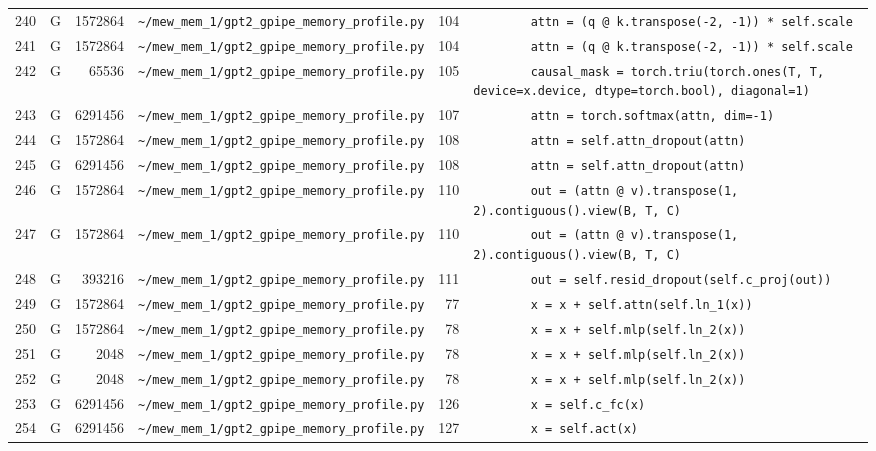 \documentclass{article}
\begin{document}
\begin{longtable}{r l r p{6.5cm} r p{7.0cm}}
240 & G & 1572864 & \lstinline|~/mew_mem_1/gpt2_gpipe_memory_profile.py| & 104 & \lstinline|        attn = (q @ k.transpose(-2, -1)) * self.scale| \\
241 & G & 1572864 & \lstinline|~/mew_mem_1/gpt2_gpipe_memory_profile.py| & 104 & \lstinline|        attn = (q @ k.transpose(-2, -1)) * self.scale| \\
242 & G & 65536 & \lstinline|~/mew_mem_1/gpt2_gpipe_memory_profile.py| & 105 & \lstinline|        causal_mask = torch.triu(torch.ones(T, T, device=x.device, dtype=torch.bool), diagonal=1)| \\
243 & G & 6291456 & \lstinline|~/mew_mem_1/gpt2_gpipe_memory_profile.py| & 107 & \lstinline|        attn = torch.softmax(attn, dim=-1)| \\
244 & G & 1572864 & \lstinline|~/mew_mem_1/gpt2_gpipe_memory_profile.py| & 108 & \lstinline|        attn = self.attn_dropout(attn)| \\
245 & G & 6291456 & \lstinline|~/mew_mem_1/gpt2_gpipe_memory_profile.py| & 108 & \lstinline|        attn = self.attn_dropout(attn)| \\
246 & G & 1572864 & \lstinline|~/mew_mem_1/gpt2_gpipe_memory_profile.py| & 110 & \lstinline|        out = (attn @ v).transpose(1, 2).contiguous().view(B, T, C)| \\
247 & G & 1572864 & \lstinline|~/mew_mem_1/gpt2_gpipe_memory_profile.py| & 110 & \lstinline|        out = (attn @ v).transpose(1, 2).contiguous().view(B, T, C)| \\
248 & G & 393216 & \lstinline|~/mew_mem_1/gpt2_gpipe_memory_profile.py| & 111 & \lstinline|        out = self.resid_dropout(self.c_proj(out))| \\
249 & G & 1572864 & \lstinline|~/mew_mem_1/gpt2_gpipe_memory_profile.py| & 77 & \lstinline|        x = x + self.attn(self.ln_1(x))| \\
250 & G & 1572864 & \lstinline|~/mew_mem_1/gpt2_gpipe_memory_profile.py| & 78 & \lstinline|        x = x + self.mlp(self.ln_2(x))| \\
251 & G & 2048 & \lstinline|~/mew_mem_1/gpt2_gpipe_memory_profile.py| & 78 & \lstinline|        x = x + self.mlp(self.ln_2(x))| \\
252 & G & 2048 & \lstinline|~/mew_mem_1/gpt2_gpipe_memory_profile.py| & 78 & \lstinline|        x = x + self.mlp(self.ln_2(x))| \\
253 & G & 6291456 & \lstinline|~/mew_mem_1/gpt2_gpipe_memory_profile.py| & 126 & \lstinline|        x = self.c_fc(x)| \\
254 & G & 6291456 & \lstinline|~/mew_mem_1/gpt2_gpipe_memory_profile.py| & 127 & \lstinline|        x = self.act(x)| \\

\end{longtable}
\end{document}
